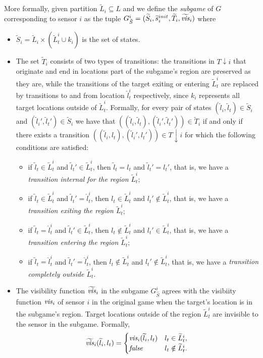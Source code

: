 More formally, given partition $\widetilde{L}_i \subseteq L$ and we define the \emph{subgame} of $G$ corresponding to sensor $i$ as the tuple $G^{i}_{\tilde{S}} = (\widetilde{S}_i,\widetilde{s}_i^{init},\widetilde{T}_i,\widetilde{\mathit{vis}}_i)$  where
\begin{itemize}
\item $\widetilde{S}_i= \widetilde{L}_i \times (\widetilde{L}^i_t \cup k_i)$ is the set of states.
\item The set $\widetilde{T}_i$ consists of two types of transitions: the transitions in $T{\downarrow } i$ that originate and end in locations part of the subgame's region are preserved as they are, while the transitions of the target exiting or entering $\widetilde{L}^i_t$ are replaced by transitions to and from location $\hat{l}^i_t$ respectively, since $k_i$ represents all target locations outside of  $\widetilde{L}^i_t$. 
Formally, for every pair of states $(\widetilde{l}_i,\widetilde{l}_t) \in \widetilde{S}_i$ and $(\widetilde{l}_i',\widetilde{l}_t') \in \widetilde{S}_i$ we have that $((\widetilde{l}_i,\widetilde l_t),(\widetilde{l}_i',\widetilde l_t')) \in \widetilde T_i$ if and only if there exists a transition
 $((\widetilde{l}_i,l_t),(\widetilde{l}_i',l_t')) \in T{\downarrow}i$ for which the following conditions are satisfied:
 \begin{itemize}
 \item if $\widetilde l_t \in \widetilde L_t ^i$ and $\widetilde l_t' \in \widetilde L_t ^i$, then 
 $\widetilde l_t = l_t$ and $\widetilde l_t'= l_t'$, that is, we have a \emph{transition internal for the region $\widetilde L_t^i$};
 \item if $\widetilde l_t \in \widetilde L_t ^i$ and $\widetilde l_t' =  \hat l^i_t$, then 
 $l_t \in \widetilde L_t^i$ and $l_t' \not\in \widetilde L_t^i$, that is, we have a \emph{transition exiting the region $\widetilde L_t^i$}; 
 \item if $\widetilde l_t= \hat l^i_t$ and $\widetilde l_t' \in  \widetilde L_t ^i$, then 
 $l_t \not \in \widetilde L_t^i$ and $l_t' \in \widetilde L_t^i$, that is, we have a \emph{transition entering the region $\widetilde L_t^i$}; 
 \item if $\widetilde l_t= \hat l^i_t$ and $\widetilde l_t' =  \hat l^i_t$, then 
 $l_t \not \in \widetilde L_t^i$ and $l_t' \not\in \widetilde L_t^i$, that is, we have a \emph{transition completely outside $\widetilde L_t^i$}.
\end{itemize}  

  \item The visibility function $\widetilde{\mathit{vis}}_i$ in the subgame $G^{i}_{\hat{S}}$ agrees with the visibiity function $\mathit{vis}_i$ of sensor $i$ in the original game when the target's location is in the subgame's region. Target locations outside of the region $\widetilde L_t^i$ are invisible to the sensor in the subgame. Formally, 
 \[\widetilde{\mathit{vis}}_i(\widetilde{l}_i,l_t) = \begin{cases}
\mathit{vis}_i(\widetilde{l}_i,l_t) & l_t \in \widetilde{L}_t^i, \\
\mathit{false} & l_t \notin \widetilde{L}_t^i.
\end{cases}
\]
\end{itemize}
